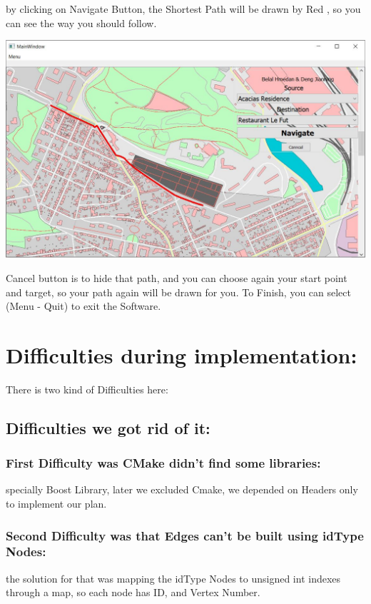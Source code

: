 \documentclass[a4paper, 12pt, english]{book}
\begin{document}
by clicking on Navigate Button, the Shortest Path will be drawn by Red , so you can see the way you should follow.
\begin{center}
\includegraphics[width=.6\textwidth]{GUI_Map2.JPG}
\end{center}
Cancel button is to hide that path, and you can choose again your start point and target, so your path again will be drawn for you.
To Finish, you can select (Menu - Quit) to exit the Software.





\section{Difficulties during implementation:}
There is two kind of Difficulties here:
\subsection{Difficulties we got rid of it:} 
\subsubsection{First Difficulty was CMake didn’t find some libraries:}
specially Boost Library, later we excluded Cmake, we depended on Headers only to implement our plan.
\subsubsection{Second Difficulty was that Edges can’t be built using idType Nodes:} the solution for that was mapping the idType Nodes to unsigned int indexes through a map, so each node has ID, and Vertex Number.
\end{document}
